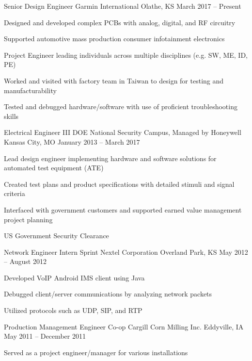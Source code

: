 \documentclass[]{awesome-cv}
\begin{document}
\vspace{-2mm}
\begin{cventries}
	\cventry
	{Senior Design Engineer}
	{Garmin International}
	{Olathe, KS}
	{March 2017 – Present}
	{\begin{cvitems}
		\item {Designed and developed complex PCBs with analog, digital, and RF circuitry}
		\item {Supported automotive mass production consumer infotainment electronics}
		\item {Project Engineer leading individuals across multiple disciplines (e.g. SW, ME, ID, PE)}
		\item {Worked and visited with factory team in Taiwan to design for testing and manufacturability}
		\item {Tested and debugged hardware/software with use of proficient troubleshooting skills}
		\end{cvitems}}
	\cventry
	{Electrical Engineer III}
	{DOE National Security Campus, Managed by Honeywell}
	{Kansas City, MO}
	{January 2013 – March 2017}
	{\begin{cvitems}
		\item {Lead design engineer implementing hardware and software solutions for automated test equipment (ATE)}
		\item {Created test plans and product specifications with detailed stimuli and signal criteria}
		\item {Interfaced with government customers and supported earned value management project planning}
		\item {US Government Security Clearance}
		\end{cvitems}}
	\cventry
	{Network Engineer Intern}
	{Sprint Nextel Corporation}
	{Overland Park, KS}
	{May 2012 – August 2012}
	{\begin{cvitems}
		\item {Developed VoIP Android IMS client using Java}
		\item {Debugged client/server communications by analyzing network packets}
		\item {Utilized protocols such as UDP, SIP, and RTP}
		\end{cvitems}}
	\cventry
	{Production Management Engineer Co-op}
	{Cargill Corn Milling Inc.}
	{Eddyville, IA}
	{May 2011 – December 2011}
	{\begin{cvitems}
		\item {Served as a project engineer/manager for various installations}

\end{cvitems}}
\end{cventries}
\end{document}

